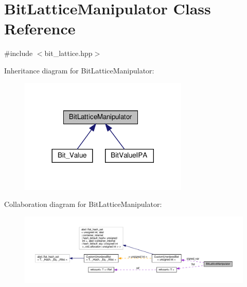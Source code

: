 \hypertarget{classBitLatticeManipulator}{}\section{Bit\+Lattice\+Manipulator Class Reference}
\label{classBitLatticeManipulator}


{\ttfamily \#include $<$bit\+\_\+lattice.\+hpp$>$}



Inheritance diagram for Bit\+Lattice\+Manipulator\+:
\nopagebreak
\begin{figure}[H]
\begin{center}
\leavevmode
\includegraphics[width=228pt]{d4/dbc/classBitLatticeManipulator__inherit__graph}
\end{center}
\end{figure}


Collaboration diagram for Bit\+Lattice\+Manipulator\+:
\nopagebreak
\begin{figure}[H]
\begin{center}
\leavevmode
\includegraphics[width=350pt]{d2/dc1/classBitLatticeManipulator__coll__graph}
\end{center}
\end{figure}
